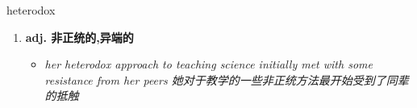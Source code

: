 
\begin{frame}
{\huge heterodox}
\begin{center}
\begin{enumerate}\Large
  \item \textbf{adj. 非正统的,异端的}
  \begin{itemize}
    \item \em{\Large{her heterodox approach to teaching science initially met with some resistance from her peers 她对于教学的一些非正统方法最开始受到了同辈的抵触}}
  \end{itemize}
\end{enumerate}
\end{center}
\end{frame}

